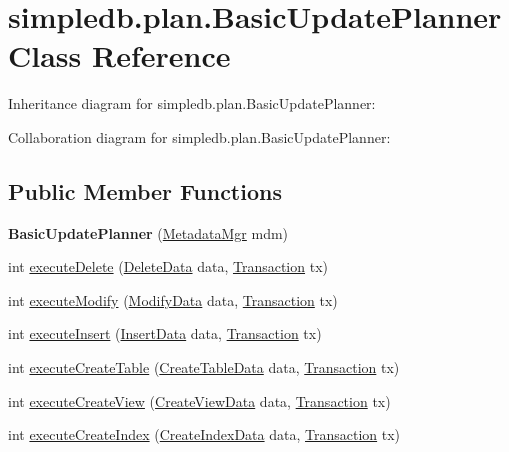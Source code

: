 \hypertarget{classsimpledb_1_1plan_1_1BasicUpdatePlanner}{}\section{simpledb.\+plan.\+Basic\+Update\+Planner Class Reference}
\label{classsimpledb_1_1plan_1_1BasicUpdatePlanner}


Inheritance diagram for simpledb.\+plan.\+Basic\+Update\+Planner\+:


Collaboration diagram for simpledb.\+plan.\+Basic\+Update\+Planner\+:
\subsection*{Public Member Functions}
\begin{DoxyCompactItemize}
\item 
\mbox{\label{classsimpledb_1_1plan_1_1BasicUpdatePlanner_ae17f4d894094ec0be236a798d998af3b}} 
{\bfseries Basic\+Update\+Planner} (\hyperlink{classsimpledb_1_1metadata_1_1MetadataMgr}{Metadata\+Mgr} mdm)
\item 
int \hyperlink{classsimpledb_1_1plan_1_1BasicUpdatePlanner_ae6881ef6bd8ea00c07dd66ee8153bfb9}{execute\+Delete} (\hyperlink{classsimpledb_1_1parse_1_1DeleteData}{Delete\+Data} data, \hyperlink{classsimpledb_1_1tx_1_1Transaction}{Transaction} tx)
\item 
int \hyperlink{classsimpledb_1_1plan_1_1BasicUpdatePlanner_a938959eb04b3f6079876760e67b4627f}{execute\+Modify} (\hyperlink{classsimpledb_1_1parse_1_1ModifyData}{Modify\+Data} data, \hyperlink{classsimpledb_1_1tx_1_1Transaction}{Transaction} tx)
\item 
int \hyperlink{classsimpledb_1_1plan_1_1BasicUpdatePlanner_a8c1ed83755ef7d71adab3590b3d995fa}{execute\+Insert} (\hyperlink{classsimpledb_1_1parse_1_1InsertData}{Insert\+Data} data, \hyperlink{classsimpledb_1_1tx_1_1Transaction}{Transaction} tx)
\item 
int \hyperlink{classsimpledb_1_1plan_1_1BasicUpdatePlanner_ad29eefdb27d7f1c40de1af9031abc5b8}{execute\+Create\+Table} (\hyperlink{classsimpledb_1_1parse_1_1CreateTableData}{Create\+Table\+Data} data, \hyperlink{classsimpledb_1_1tx_1_1Transaction}{Transaction} tx)
\item 
int \hyperlink{classsimpledb_1_1plan_1_1BasicUpdatePlanner_a2c43aed5eb272962bd57a66bdb200ce3}{execute\+Create\+View} (\hyperlink{classsimpledb_1_1parse_1_1CreateViewData}{Create\+View\+Data} data, \hyperlink{classsimpledb_1_1tx_1_1Transaction}{Transaction} tx)
\item 
int \hyperlink{classsimpledb_1_1plan_1_1BasicUpdatePlanner_a662b9a96ae0b34c6820cf7e1c25a0577}{execute\+Create\+Index} (\hyperlink{classsimpledb_1_1parse_1_1CreateIndexData}{Create\+Index\+Data} data, \hyperlink{classsimpledb_1_1tx_1_1Transaction}{Transaction} tx)
\end{DoxyCompactItemize}


